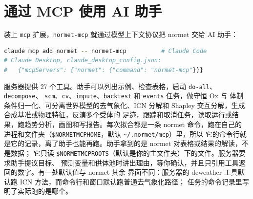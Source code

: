 \documentclass[11pt]{ctexrep}
\newcommand{\nm}{\textsf{normet}}
\newcommand{\codeunderscore}{\textunderscore\allowbreak}
\newcommand{\code}[1]{\texttt{\let\_\codeunderscore #1}}
\begin{document}
\section{通过 MCP 使用 AI 助手}\label{sec:mcp}
装上 \code{mcp} 扩展，\code{normet-mcp} 就通过模型上下文协议把 \nm{} 交给 AI 助手：
\begin{lstlisting}[language=bash]
claude mcp add normet -- normet-mcp          # Claude Code
# Claude Desktop, claude_desktop_config.json:
#   {"mcpServers": {"normet": {"command": "normet-mcp"}}}
\end{lstlisting}
服务器提供 27 个工具。助手可以列出示例、检查表格，启动 \code{do-all}、\code{decompose}、
\code{scm}、\code{cv}、\code{impute}、\code{backtest} 和 \code{events} 任务，做守恒 Ox 与
体制条件归一化、可分离世界模型的去气象化、ICN 分解和 Shapley 交互分解，生成合成基准或物理特征，反演多个受体的
足迹，跟踪和取消任务，读取运行或结果，跑趋势分析，画图和写报告。每次拟合都是一条 \nm{}
命令，跑在自己的
进程和文件夹（\code{\$NORMET\_MCP\_HOME}，默认 \code{\textasciitilde/.normet/mcp}）里，所以
它的命令行就是它的记录，离了助手也能再跑。助手拿到的是 \nm{} 对表格或结果的解读，不是数据；
它只读 \code{\$NORMET\_MCP\_ROOTS}（默认是你的主文件夹）下的文件。服务器要求助手提议目标、
预测变量和供体池时讲出理由，等你确认，并且只引用工具返回的数字。有一处默认值与 \nm{} 其余
界面不同：服务器的 deweather 工具默认跑 ICN 方法，而命令行和窗口默认跑普通去气象化路径；
任务的命令记录里写明了实际跑的是哪个。

\appendix
\end{document}
